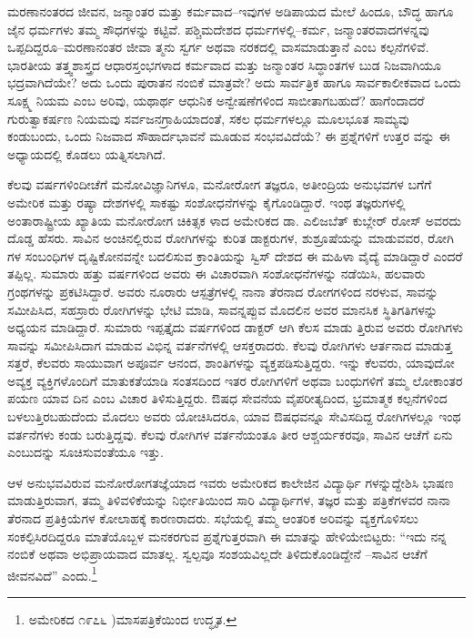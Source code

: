 ಮರಣಾನಂತರದ ಜೀವನ, ಜನ್ಮಾಂತರ ಮತ್ತು ಕರ್ಮವಾದ–ಇವುಗಳ ಅಡಿಪಾಯದ ಮೇಲೆ ಹಿಂದೂ, ಬೌದ್ಧ ಹಾಗೂ ಜೈನ ಧರ್ಮಗಳು ತಮ್ಮ ಸೌಧಗಳನ್ನು ಕಟ್ಟಿವೆ. ಪಶ್ಚಿಮದೇಶದ ಧರ್ಮಗಳಲ್ಲಿ–ಕರ್ಮ, ಜನ್ಮಾಂತರವಾದಗಳನ್ನವು ಒಪ್ಪದಿದ್ದರೂ–ಮರಣಾನಂತರ ಜೀವಾ ತ್ಮನು ಸ್ವರ್ಗ ಅಥವಾ ನರಕದಲ್ಲಿ ವಾಸಮಾಡುತ್ತಾನೆ ಎಂಬ ಕಲ್ಪನೆಗಳಿವೆ. ಭಾರತೀಯ ತತ್ತ್ವಶಾಸ್ತ್ರದ ಆಧಾರಸ್ತಂಭಗಳಾದ ಕರ್ಮವಾದ ಮತ್ತು ಜನ್ಮಾಂತರ ಸಿದ್ಧಾಂತಗಳ ಬುಡ ನಿಜವಾಗಿಯೂ ಭದ್ರವಾಗಿದೆಯೇ? ಅದು ಒಂದು ಪುರಾತನ ನಂಬಿಕೆ ಮಾತ್ರವೇ? ಅದು ಸಾರ್ವತ್ರಿಕ ಹಾಗೂ ಸಾರ್ವಕಾಲೀಕವಾದ ಒಂದು ಸೂಕ್ಷ್ಮ ನಿಯಮ ಎಂಬ ಅರಿವು, ಯಥಾರ್ಥ ಆಧುನಿಕ ಅನ್ವೇಷಣೆಗಳಿಂದ ಸಾಬೀತಾಗಬಹುದೆ? ಹಾಗೆಂದಾದರೆ ಗುರುತ್ವಾಕರ್ಷಣ ನಿಯಮವು ಸರ್ವಜನಗ್ರಾಹಿಯಾದಂತೆ, ಸಕಲ ಧರ್ಮಗಳಲ್ಲೂ ಮೂಲಭೂತ ಸಾಮ್ಯವು ಕಂಡುಬಂದು, ಒಂದು ನಿಜವಾದ ಸೌಹಾರ್ದಭಾವನೆ ಮೂಡುವ ಸಂಭವವಿದೆಯೆ? ಈ ಪ್ರಶ್ನೆಗಳಿಗೆ ಉತ್ತರ ವನ್ನು ಈ ಅಧ್ಯಾಯದಲ್ಲಿ ಕೊಡಲು ಯತ್ನಿಸಲಾಗಿದೆ.

ಕೆಲವು ವರ್ಷಗಳಿಂದೀಚೆಗೆ ಮನೋವಿಜ್ಞಾನಿಗಳೂ, ಮನೋರೋಗ ತಜ್ಞರೂ, ಅತೀಂದ್ರಿಯ ಅನುಭವಗಳ ಬಗೆಗೆ ಅಮೇರಿಕ ಮತ್ತು ರಷ್ಯಾ ದೇಶಗಳಲ್ಲಿ ಸಾಕಷ್ಟು ಸಂಶೋಧನೆಗಳನ್ನು ಕೈಗೊಂಡಿದ್ದಾರೆ. ಇಂಥ ತಜ್ಞರುಗಳಲ್ಲಿ ಅಂತಾರಾಷ್ಟ್ರೀಯ ಖ್ಯಾತಿಯ ಮನೋರೋಗ ಚಿಕಿತ್ಸಕ ಳಾದ ಅಮೇರಿಕದ ಡಾ. ಎಲಿಜಬೆತ್ ಕುಬ್ಲೇರ್ ರೋಸ್ ಅವರದು ದೊಡ್ಡ ಹೆಸರು. ಸಾವಿನ ಅಂಚಿನಲ್ಲಿರುವ ರೋಗಿಗಳನ್ನು ಕುರಿತ ಡಾಕ್ಟರುಗಳ, ಶುಶ್ರೂಷೆಯನ್ನು ಮಾಡುವವರ, ರೋಗಿ ಗಳ ಸಂಬಂಧಿಗಳ ದೃಷ್ಟಿಕೋನವನ್ನೇ ಬದಲಿಸುವ ಕ್ರಾಂತಿಯನ್ನು ಸ್ವಿಸ್ ದೇಶದ ಈ ಮಹಿಳಾ ವೈದ್ಯೆ ಮಾಡಿದ್ದಾರೆ ಎಂದರೆ ತಪ್ಪಿಲ್ಲ. ಸುಮಾರು ಹತ್ತು ವರ್ಷಗಳಿಂದ ಅವರು ಈ ವಿಚಾರವಾಗಿ ಸಂಶೋಧನೆಗಳನ್ನು ನಡೆಯಿಸಿ, ಹಲವಾರು ಗ್ರಂಥಗಳನ್ನು ಪ್ರಕಟಿಸಿದ್ದಾರೆ. ಅವರು ನೂರಾರು ಆಸ್ಪತ್ರೆಗಳಲ್ಲಿ ನಾನಾ ತೆರನಾದ ರೋಗಗಳಿಂದ ನರಳುವ, ಸಾವನ್ನು ಸಮೀಪಿಸಿದ, ಸಹಸ್ರಾರು ರೋಗಿಗಳನ್ನು ಭೇಟಿ ಮಾಡಿ, ಸಾವನ್ನಪ್ಪುವ ಮೊದಲಿನ ಅವರ ಮಾನಸಿಕ ಸ್ಥಿತಿಗತಿಗಳನ್ನು ಅಧ್ಯಯನ ಮಾಡಿದ್ದಾರೆ. ಸುಮಾರು ಇಪ್ಪತ್ತೈದು ವರ್ಷಗಳಿಂದ ಡಾಕ್ಟರ್ ಆಗಿ ಕೆಲಸ ಮಾಡು ತ್ತಿರುವ ಅವರು ರೋಗಿಗಳು ಸಾವನ್ನು ಸಮೀಪಿಸಿದಾಗ ಮಾಡುವ ವಿಭಿನ್ನ ವರ್ತನೆಗಳಲ್ಲಿ ಆಸಕ್ತರಾದರು. ಕೆಲವು ರೋಗಿಗಳು ಆರ್ತನಾದ ಮಾಡುತ್ತ ಸತ್ತರೆ, ಕೆಲವರು ಸಾಯುವಾಗ ಅಪೂರ್ವ ಆನಂದ, ಶಾಂತಿಗಳನ್ನು ವ್ಯಕ್ತಪಡಿಸುತ್ತಿದ್ದರು. ಇನ್ನು ಕೆಲವರು, ಯಾವುದೋ ಅವ್ಯಕ್ತ ವ್ಯಕ್ತಿಗಳೊಂದಿಗೆ ಮಾತುಕತೆಯಾಡಿ ಸಂತಸದಿಂದ ಇತರ ರೋಗಿಗಳಿಗೆ ಅಥವಾ ಬಂಧುಗಳಿಗೆ ತಮ್ಮ ಲೋಕಾಂತರ ಪಯಣ ಯಾವ ದಿನ ಎಂಬ ವಿಚಾರ ತಿಳಿಸುತ್ತಿದ್ದರು. ಔಷಧ ಸೇವನೆಯ ವೈಪರೀತ್ಯದಿಂದ, ಭ್ರಮಾತ್ಮಕ ಕಲ್ಪನೆಗಳಿಂದ ಬಳಲುತ್ತಿರಬಹುದೆಂದು ಮೊದಲು ಅವರು ಯೋಚಿಸಿದರೂ, ಯಾವ ಔಷಧವನ್ನೂ ಸೇವಿಸದಿದ್ದ ರೋಗಿಗಳಲ್ಲೂ ಇಂಥ ವರ್ತನೆಗಳು ಕಂಡು ಬರುತ್ತಿದ್ದವು. ಕೆಲವು ರೋಗಿಗಳ ವರ್ತನೆಯಂತೂ ತೀರ ಆಶ್ಚರ್ಯಕರವೂ, ಸಾವಿನ ಆಚೆಗೆ ಏನು ಎಂಬುದನ್ನು ಸೂಚಿಸುವಂತೆಯೂ ಇತ್ತು.

ಆಳ ಅನುಭವವಿರುವ ಮನೋರೋಗತಜ್ಞೆಯಾದ ಇವರು ಅಮೇರಿಕದ ಕಾಲೇಜಿನ ವಿದ್ಯಾರ್ಥಿ ಗಳನ್ನುದ್ದೇಶಿಸಿ ಭಾಷಣ ಮಾಡುತ್ತಿರುವಾಗ, ತಮ್ಮ ತಿಳಿವಳಿಕೆಯನ್ನು ನಿರ್ಭೀತಿಯಿಂದ ಸಾರಿ ವಿದ್ಯಾರ್ಥಿಗಳ, ತಜ್ಞರ ಮತ್ತು ಪತ್ರಿಕೆಗಳವರ ನಾನಾ ತೆರನಾದ ಪ್ರತಿಕ್ರಿಯೆಗಳ ಕೋಲಾಹಕ್ಕೆ ಕಾರಣರಾದರು. ಸಭೆಯಲ್ಲಿ ತಮ್ಮ ಆಂತರಿಕ ಅರಿವನ್ನು ವ್ಯಕ್ತಗೊಳಿಸಲು ಸಂಕಲ್ಪಿಸಿರದಿದ್ದರೂ ಮಾತೆಯೊಬ್ಬಳ ಮನಕರಗುವ ಪ್ರಶ್ನೆಗುತ್ತರವಾಗಿ ಈ ಮಾತನ್ನು ಹೇಳಿಯೇಬಿಟ್ಟರು: “ಇದು ನನ್ನ ನಂಬಿಕೆ ಅಥವಾ ಅಭಿಪ್ರಾಯವಾದ ಮಾತಲ್ಲ. ಸ್ವಲ್ಪವೂ ಸಂಶಯವಿಲ್ಲದೇ ತಿಳಿದುಕೊಂಡಿದ್ದೇನೆ –ಸಾವಿನ ಆಚೆಗೆ ಜೀವನವಿದೆ” ಎಂದು.\footnote{ಅಮೇರಿಕದ ೧೯೭೬ )ಮಾಸಪತ್ರಿಕೆಯಿಂದ ಉದ್ಧೃತ.}

